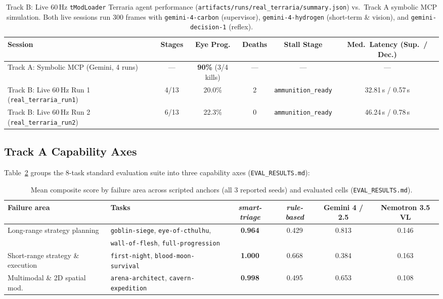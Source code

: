 \documentclass[10pt,letterpaper]{article}
\begin{document}
\begin{table}[t]
\centering
\caption{Track B: Live 60\,Hz \texttt{tModLoader} Terraria agent performance (\texttt{artifacts/runs/real\_terraria/summary.json}) vs.\ Track A symbolic MCP simulation. Both live sessions run 300 frames with \texttt{gemini-4-carbon} (supervisor), \texttt{gemini-4-hydrogen} (short-term \& vision), and \texttt{gemini-decision-1} (reflex).}
\label{tab:live60hz}
\begin{tabular}{lccccc}
\toprule
Session & Stages & Eye Prog. & Deaths & Stall Stage & Med.\ Latency (Sup.\ / Dec.) \\
\midrule
Track A: Symbolic MCP (Gemini, 4 runs) & --- & \textbf{90\%} (3/4 kills) & --- & --- & --- \\
Track B: Live 60\,Hz Run 1 (\texttt{real\_terraria\_run1}) & 4/13 & 20.0\% & 2 & \texttt{ammunition\_ready} & 32.81\,s / 0.57\,s \\
Track B: Live 60\,Hz Run 2 (\texttt{real\_terraria\_run2}) & 6/13 & 22.3\% & 0 & \texttt{ammunition\_ready} & 46.24\,s / 0.78\,s \\
\bottomrule
\end{tabular}
\end{table}

\subsection{Track A Capability Axes}
Table~\ref{tab:areas} groups the 8-task standard evaluation suite into three capability axes (\texttt{EVAL\_RESULTS.md}):
\begin{table}[t]
\centering
\caption{Mean composite score by failure area across scripted anchors (all 3 reported seeds) and evaluated cells (\texttt{EVAL\_RESULTS.md}).}
\label{tab:areas}
\begin{tabular}{llcccc}
\toprule
Failure area & Tasks & \textit{smart-triage} & \textit{rule-based} & Gemini 4 / 2.5 & Nemotron 3.5 VL \\
\midrule
Long-range strategy planning & \texttt{goblin-siege}, \texttt{eye-of-cthulhu}, & \textbf{0.964} & 0.429 & 0.813 & 0.146 \\
 & \texttt{wall-of-flesh}, \texttt{full-progression} & & & & \\
Short-range strategy \& execution & \texttt{first-night}, \texttt{blood-moon-survival} & \textbf{1.000} & 0.668 & 0.384 & 0.163 \\
Multimodal \& 2D spatial mod. & \texttt{arena-architect}, \texttt{cavern-expedition} & \textbf{0.998} & 0.495 & 0.653 & 0.108 \\
\bottomrule
\end{tabular}
\end{table}
\end{document}
